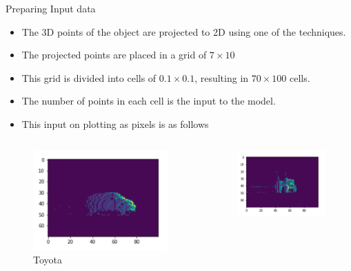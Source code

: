 \documentclass[9pt]{beamer}
\begin{document}
\begin{frame}[fragile]{Preparing Input data}
	\begin{itemize}
		\item The 3D points of the object are projected to 2D using one of the techniques.
		\item The projected points are placed in a grid of $7 \times 10$
		\item This grid is divided into cells of $0.1 \times 0.1$, resulting in $70 \times 100$ cells.
		\item The number of points in each cell is the input to the model.
		\item This input on plotting as pixels is as follows
	\end{itemize}

	\begin{columns}
		\begin{column}{0.33\textwidth}
			\begin{figure}
				\centering
				\includegraphics[width=\textwidth]{images/Toyota.png}
				\caption{Toyota}
			\end{figure}
		\end{column}
		\begin{column}{0.33\textwidth}
			\begin{figure}
				\centering
				\includegraphics[width=\textwidth]{images/Tractor.png}		

\end{figure}
\end{column}
\end{columns}
\end{frame}
\end{document}
